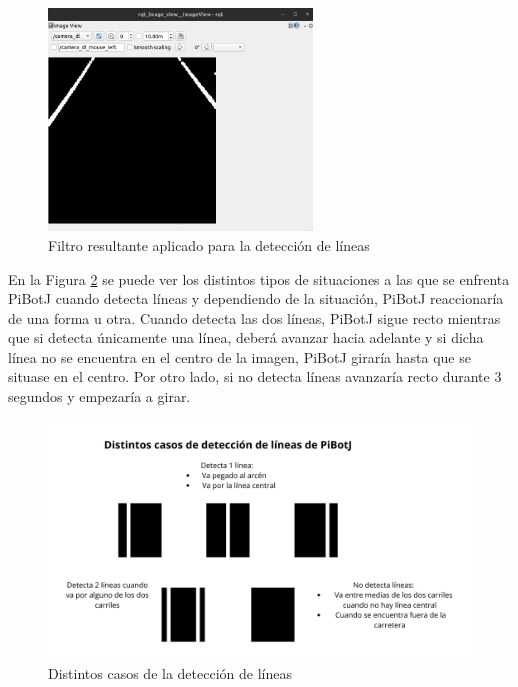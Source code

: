  \begin{figure} [h!]
	\begin{center}
		\includegraphics[width=7cm]{figs/cap6/camaradlines.png}
	\end{center}
	\caption{Filtro resultante aplicado para la detección de líneas}
	\label{fig:camaradlines}
\end{figure}


En la Figura \ref{fig:dlines} se puede ver los distintos tipos de situaciones a las que se enfrenta PiBotJ cuando detecta líneas y dependiendo de la situación, PiBotJ reaccionaría de una forma u otra. Cuando detecta las dos líneas, PiBotJ sigue recto mientras que si detecta únicamente una línea, deberá avanzar hacia adelante y si dicha línea no se encuentra en el centro de la imagen, PiBotJ giraría hasta que se situase en el centro. Por otro lado, si no detecta líneas avanzaría recto durante 3 segundos y empezaría a girar.

 \begin{figure} [h!]
	\begin{center}
		\includegraphics[width=15cm]{figs/cap6/casosdlines.png}
	\end{center}
	\caption{Distintos casos de la detección de líneas}
	\label{fig:dlines}
\end{figure}

